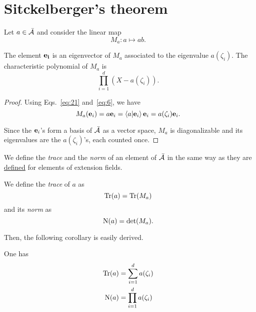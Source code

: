 \section{Sitckelberger's theorem}
\label{sec:multiplication}

Let $a\in\bar{\mathcal{A}}$ and consider the linear map
\begin{equation}
  \label{eq:18}
  M_a:a \mapsto ab
  \text{.}
\end{equation}

\begin{theorem}[Stickelberger]
  \label{th:stickelberger}
  The element $\mathbf{e_i}$ is an eigenvector of $M_a$ associated to
  the eigenvalue $a(\zeta_i)$. The characteristic polynomial of $M_a$
  is
  \[\prod_{i=1}^d(X-a(\zeta_i))\text{.}\]
\end{theorem}
\begin{proof}
  Using Eqs.~\eqref{eq:21} and~\eqref{eq:6}, we have
  \begin{equation}
    \label{eq:19}
    M_a(\mathbf{e}_i) = a\mathbf{e}_i = \left\langle a \middle| \mathbf{e}_i \right\rangle\mathbf{e}_i=a(\zeta_i)\mathbf{e}_i
    \text{.}
  \end{equation}

  Since the $\mathbf{e}_i$'s form a basis of $\bar{\mathcal{A}}$ as a
  vector space, $M_a$ is diagonalizable and its eigenvalues are the
  $a(\zeta_i)$'s, each counted once.
\end{proof}

  We define the \emph{trace} and
the \emph{norm} of an element of $\bar{\mathcal{A}}$ in the same way as
they are \hyperref[sec:basic-galois-theory:galois-extensions]{defined}
for elements of extension fields.

\begin{definition}
  \label{def:trace}
  We define the \emph{trace} of $a$ as
  \[\operatorname{Tr}(a) = \operatorname{Tr}(M_a)\]
  and its \emph{norm} as
  \[\operatorname{N}(a) = \det(M_a)\text{.}\]
\end{definition}
Then, the following corollary is easily derived.

\begin{corollary}
  \label{th:stickelberger-trace-det}
  One has
  \begin{align}
    \label{eq:23}
    \operatorname{Tr}(a) &= \sum_{i=1}^da(\zeta_i)\\
    \label{eq:24}
    \operatorname{N}(a) &= \prod_{i=1}^da(\zeta_i)
  \end{align}
\end{corollary}

